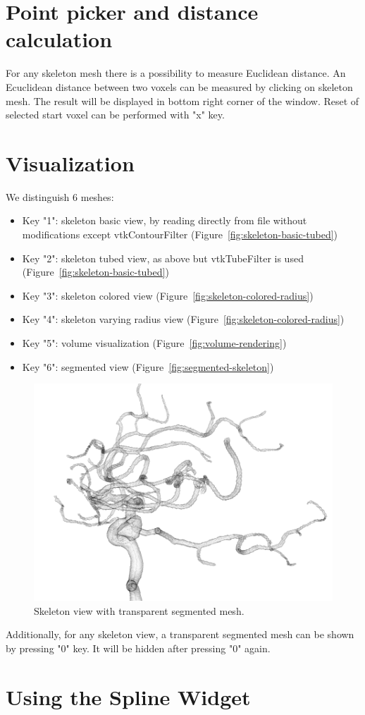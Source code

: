\section{Point picker and distance calculation}

For any skeleton mesh there is a possibility to measure Euclidean distance. An Ecuclidean distance between two voxels can be measured by clicking on skeleton mesh. The result will be displayed in bottom right corner of the window. Reset of selected start voxel can be performed with "x" key.

\section{Visualization}

We distinguish 6 meshes:
\begin{itemize}
	\item Key "1": skeleton basic view, by reading directly from file without modifications except vtkContourFilter (Figure~\ref{fig:skeleton-basic-tubed})
	\item Key "2": skeleton tubed view, as above but vtkTubeFilter is used (Figure~\ref{fig:skeleton-basic-tubed})
	\item Key "3": skeleton colored view (Figure~\ref{fig:skeleton-colored-radius})
	\item Key "4": skeleton varying radius view (Figure~\ref{fig:skeleton-colored-radius})
	\item Key "5": volume visualization (Figure~\ref{fig:volume-rendering})
	\item Key "6": segmented view (Figure~\ref{fig:segmented-skeleton})
\end{itemize}

\begin{figure}
	\centering
	\includegraphics[scale=0.4]{fig/skeleton-transparent-segmented}
	\caption{Skeleton view with transparent segmented mesh.}
	\label{fig:skeleton-transparent-segmented}
\end{figure}

Additionally, for any skeleton view, a transparent segmented mesh can be shown by pressing "0" key. It will be hidden after pressing "0" again.

\section{Using the Spline Widget}


